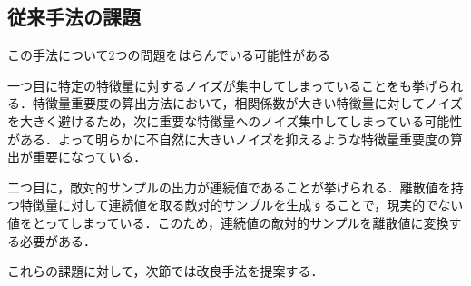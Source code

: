 

\subsection{従来手法の課題}


この手法について2つの問題をはらんでいる可能性がある

一つ目に特定の特徴量に対するノイズが集中してしまっていることをも挙げられる．特徴量重要度の算出方法において，相関係数が大きい特徴量に対してノイズを大きく避けるため，次に重要な特徴量へのノイズ集中してしまっている可能性がある．よって明らかに不自然に大きいノイズを抑えるような特徴量重要度の算出が重要になっている．
    

二つ目に，敵対的サンプルの出力が連続値であることが挙げられる．離散値を持つ特徴量に対して連続値を取る敵対的サンプルを生成することで，現実的でない値をとってしまっている．このため，連続値の敵対的サンプルを離散値に変換する必要がある．


これらの課題に対して，次節では改良手法を提案する．